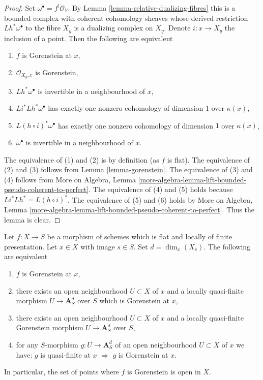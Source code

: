 \begin{proof}
Set $\omega^\bullet = f^!\mathcal{O}_Y$. By
Lemma \ref{lemma-relative-dualizing-fibres}
this is a bounded complex with coherent cohomology
sheaves whose derived restriction $Lh^*\omega^\bullet$
to the fibre $X_y$ is a dualizing complex on $X_y$.
Denote $i : x \to X_y$ the inclusion of a point.
Then the following are equivalent
\begin{enumerate}
\item $f$ is Gorenstein at $x$,
\item $\mathcal{O}_{X_y, x}$ is Gorenstein,
\item $Lh^*\omega^\bullet$ is invertible in a neighbourhood of $x$,
\item $Li^* Lh^* \omega^\bullet$ has exactly one nonzero
cohomology of dimension $1$ over $\kappa(x)$,
\item $L(h \circ i)^* \omega^\bullet$ has exactly one nonzero
cohomology of dimension $1$ over $\kappa(x)$,
\item $\omega^\bullet$ is invertible in a neighbourhood of $x$.
\end{enumerate}
The equivalence of (1) and (2) is by definition (as $f$ is flat).
The equivalence of (2) and (3) follows from
Lemma \ref{lemma-gorenstein}.
The equivalence of (3) and (4) follows from
More on Algebra, Lemma
\ref{more-algebra-lemma-lift-bounded-pseudo-coherent-to-perfect}.
The equivalence of (4) and (5) holds because
$Li^* Lh^* = L(h \circ i)^*$.
The equivalence of (5) and (6) holds by
More on Algebra, Lemma
\ref{more-algebra-lemma-lift-bounded-pseudo-coherent-to-perfect}.
Thus the lemma is clear.
\end{proof}

\begin{lemma}
\label{lemma-flat-finite-presentation-characterize-gorenstein}
Let $f : X \to S$ be a morphism of schemes which is flat and locally
of finite presentation. Let $x \in X$ with image $s \in S$.
Set $d = \dim_x(X_s)$. The following are equivalent
\begin{enumerate}
\item $f$ is Gorenstein at $x$,
\item there exists an open neighbourhood $U \subset X$ of $x$
and a locally quasi-finite morphism $U \to \mathbf{A}^d_S$ over $S$
which is Gorenstein at $x$,
\item there exists an open neighbourhood $U \subset X$ of $x$
and a locally quasi-finite Gorenstein morphism $U \to \mathbf{A}^d_S$ over $S$,
\item for any $S$-morphism $g : U \to \mathbf{A}^d_S$
of an open neighbourhood $U \subset X$ of $x$ we have:
$g$ is quasi-finite at $x$ $\Rightarrow$ $g$ is Gorenstein at $x$.
\end{enumerate}
In particular, the set of points where $f$ is Gorenstein is open in $X$.
\end{lemma}

